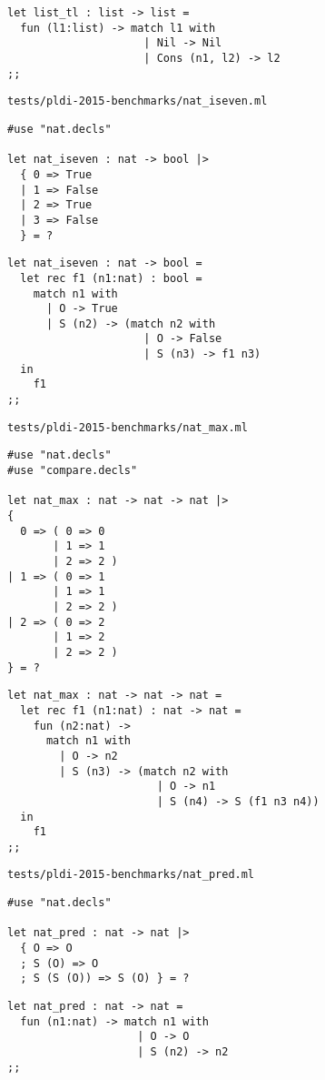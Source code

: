 \begin{verbatim}
let list_tl : list -> list =
  fun (l1:list) -> match l1 with
                     | Nil -> Nil
                     | Cons (n1, l2) -> l2
;;
\end{verbatim}

\noindent\large\texttt{tests/pldi-2015-benchmarks/nat\_iseven.ml}
\begin{verbatim}
#use "nat.decls"

let nat_iseven : nat -> bool |>
  { 0 => True
  | 1 => False
  | 2 => True
  | 3 => False
  } = ?
\end{verbatim}

\begin{verbatim}
let nat_iseven : nat -> bool =
  let rec f1 (n1:nat) : bool =
    match n1 with
      | O -> True
      | S (n2) -> (match n2 with
                     | O -> False
                     | S (n3) -> f1 n3)
  in
    f1
;;
\end{verbatim}

\noindent\large\texttt{tests/pldi-2015-benchmarks/nat\_max.ml}
\begin{verbatim}
#use "nat.decls"
#use "compare.decls"

let nat_max : nat -> nat -> nat |>
{
  0 => ( 0 => 0
       | 1 => 1
       | 2 => 2 )
| 1 => ( 0 => 1
       | 1 => 1
       | 2 => 2 )
| 2 => ( 0 => 2
       | 1 => 2
       | 2 => 2 )
} = ?
\end{verbatim}

\begin{verbatim}
let nat_max : nat -> nat -> nat =
  let rec f1 (n1:nat) : nat -> nat =
    fun (n2:nat) ->
      match n1 with
        | O -> n2
        | S (n3) -> (match n2 with
                       | O -> n1
                       | S (n4) -> S (f1 n3 n4))
  in
    f1
;;
\end{verbatim}

\noindent\large\texttt{tests/pldi-2015-benchmarks/nat\_pred.ml}
\begin{verbatim}
#use "nat.decls"

let nat_pred : nat -> nat |>
  { O => O
  ; S (O) => O
  ; S (S (O)) => S (O) } = ?
\end{verbatim}

\begin{verbatim}
let nat_pred : nat -> nat =
  fun (n1:nat) -> match n1 with
                    | O -> O
                    | S (n2) -> n2
;;
\end{verbatim}

